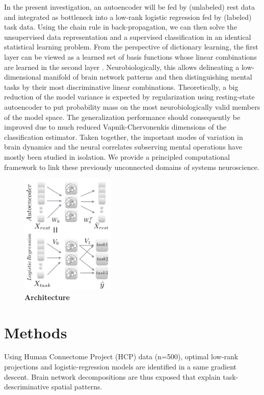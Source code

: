 \documentclass{article} %
\begin{document}
In the present investigation,
an autoencoder will be fed by (unlabeled) rest data and
integrated as bottleneck
into a low-rank logistic regression fed by (labeled) task data.
Using the chain rule in back-propagation, we can then
solve the unsupervised data representation and a supervised classification
in an identical statistical learning problem.
%
From the perspective of dictionary learning, the first layer can be
viewed as a learned set of basis functions
whose linear combinations are learned
in the second layer \cite{olshausen96}.
%
Neurobiologically, this allows 
delineating a low-dimensional manifold of brain network patterns and then 
distinguishing mental tasks
by their most discriminative linear combinations.
%
Theoretically, a big reduction of the model variance is expected by
regularization using resting-state autoencoder
to put probability mass on the most neurobiologically
valid members of the model space.
%
The generalization performance should consequently be improved due to 
much reduced Vapnik-Chervonenkis dimensions of the classification estimator.
%
Taken together,
the important modes of variation in brain dynamics and
the neural correlates subserving mental operations
have mostly been studied in isolation.
We provide a principled computational framework to link these previously
unconnected domains of systems neuroscience.

\begin{figure}
  \begin{center}
    \includegraphics[width=0.40\textwidth]{figures/figure1.png}
  \end{center}
  \caption {\textbf{Architecture}
  }
\end{figure}

%
\section{Methods}
%
Using
Human Connectome Project (HCP) data (n=500), optimal low-rank projections and
logistic-regression models are identified in a same gradient descent. Brain
network decompositions are thus exposed that explain task-descriminative spatial
patterns.
\end{document}
